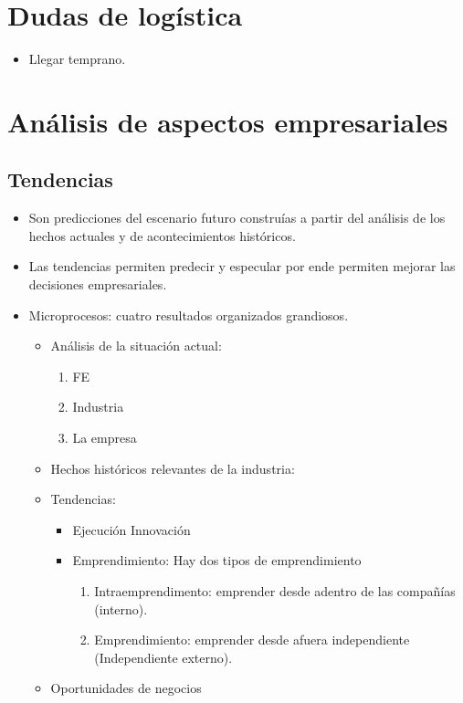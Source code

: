 \section*{Dudas de logística}
\begin{itemize}
    \item Llegar temprano.
\end{itemize}
\section{Análisis de aspectos empresariales}
\subsection{Tendencias}
\begin{itemize}
    \item Son predicciones del escenario futuro construías a partir del análisis de los hechos actuales y de acontecimientos históricos. 
    \item Las tendencias permiten predecir y especular por ende permiten mejorar las decisiones empresariales.
    \item Microprocesos: cuatro resultados organizados grandiosos.
        \begin{itemize}[label=$\downarrow$]
            \item Análisis de la situación actual:
                \begin{enumerate}
                    \item FE 
                    \item Industria
                    \item La empresa 
                \end{enumerate}
            
            \item Hechos históricos relevantes de la industria:
            
            \item Tendencias:
                \begin{itemize}
                    \item Ejecución Innovación 
                    \item Emprendimiento: Hay dos tipos de emprendimiento
                        \begin{enumerate}
                            \item Intraemprendimento: emprender desde adentro de las compañías (interno). 
                            \item Emprendimiento: emprender desde afuera independiente (Independiente externo).
                        \end{enumerate}
                \end{itemize}

            \item Oportunidades de negocios
        \end{itemize}
\end{itemize}
